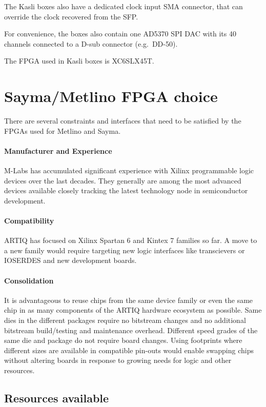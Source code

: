 \documentclass[11pt]{paper}
\begin{document}
The Kasli boxes also have a dedicated clock input SMA connector, that can override the clock recovered from the SFP.

For convenience, the boxes also contain one AD5370 SPI DAC with its 40 channels connected to a D-sub connector (e.g.\ DD-50).

The FPGA used in Kasli boxes is XC6SLX45T.

\section{Sayma/Metlino FPGA choice}

There are several constraints and interfaces that need to be satisfied by the FPGAs used for Metlino and Sayma.

\paragraph{Manufacturer and Experience} M-Labs has accumulated significant experience with Xilinx programmable logic devices over the last decades.
They generally are among the most advanced devices available closely tracking the latest technology node in semiconductor development.

\paragraph{Compatibility} ARTIQ has focused on Xilinx Spartan 6 and Kintex 7 families so far.
A move to a new family would require targeting new logic interfaces like transcievers or IOSERDES and new development boards.

\paragraph{Consolidation} It is advantageous to reuse chips from the same device family or even the same chip in as many components of the ARTIQ hardware ecosystem as possible.
Same dies in the different packages require no bitstream changes and no additional bitstream build/testing and maintenance overhead.
Different speed grades of the same die and package do not require board
changes.
Using footprints where different sizes are available in compatible pin-outs would enable swapping chips without altering boards in response to growing needs for logic and other resources.

\subsection{Resources available}
\end{document}
